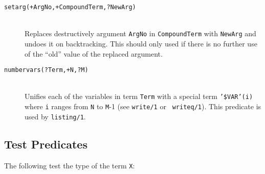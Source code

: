 \begin{description}
\item [{\tt setarg(+ArgNo,+CompoundTerm,?NewArg)}]~\\
	Replaces destructively argument {\tt ArgNo} in {\tt CompoundTerm}
	with {\tt NewArg} and undoes it on backtracking. This should
	only used if there is no further use of the ``old'' value of
	the replaced argument. 

\item [{\tt numbervars(?Term,+N,?M)}]~\\
	Unifies each of the variables in term {\tt Term} with a
	special term {\tt '\$VAR'(i)} where {\tt i} ranges
	from {\tt N} to {\tt M}-1 (see {\tt write/1} or {\tt
	writeq/1}). This predicate is used by  {\tt listing/1}.


\end{description}





\subsection{Test Predicates}

The following test the type of the term {\tt X}:

